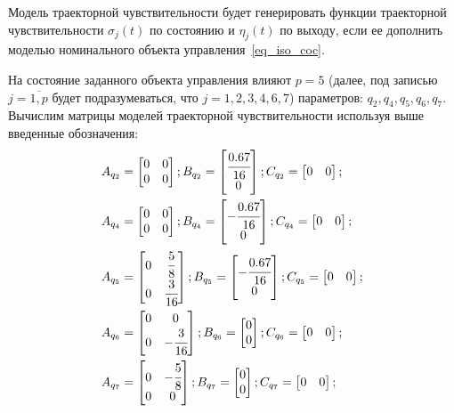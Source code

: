 Модель траекторной чувствительности будет генерировать функции траекторной чувствительности $\sigma_j (t)$ по состоянию и $\eta_j (t)$ по выходу, если ее дополнить моделью номинального объекта управления~\ref{eq_iso_coc}.

На состояние заданного объекта управления влияют $p = 5$ (далее, под записью $j = \overline{1, p}$ будет подразумеваться, что $j = 1,2,3,4,6,7$) параметров: $q_2, q_4, q_5, q_6, q_7$. Вычислим матрицы моделей траекторной чувствительности используя выше введенные обозначения:
\begin{align}
	&A_{q_2} = 
	\begin{bmatrix}
		0 & 0\\
		0 & 0
	\end{bmatrix};
	B_{q_2} = 
	\begin{bmatrix}
		\cfrac{0.67}{16}\\
		0
	\end{bmatrix};
	C_{q_2} = 
	\begin{bmatrix}
		0 & 0
	\end{bmatrix};\\
	&A_{q_4} = 
	\begin{bmatrix}
	0 & 0\\
	0 & 0
	\end{bmatrix};
	B_{q_4} = 
	\begin{bmatrix}
	-\cfrac{0.67}{16}\\
	0
	\end{bmatrix};
	C_{q_4} = 
	\begin{bmatrix}
	0 & 0
	\end{bmatrix};\\
	&A_{q_5} = 
	\begin{bmatrix}
	0 & \cfrac{5}{8}\\
	0 & \cfrac{3}{16}
	\end{bmatrix};
	B_{q_5} = 
	\begin{bmatrix}
	-\cfrac{0.67}{16}\\
	0
	\end{bmatrix};
	C_{q_5} = 
	\begin{bmatrix}
	0 & 0
	\end{bmatrix};\\
	&A_{q_6} = 
	\begin{bmatrix}
	0 & 0\\
	0 & - \cfrac{3}{16}
	\end{bmatrix};
	B_{q_6} = 
	\begin{bmatrix}
	0\\
	0
	\end{bmatrix};
	C_{q_6} = 
	\begin{bmatrix}
	0 & 0
	\end{bmatrix};\\
	&A_{q_7} = 
	\begin{bmatrix}
	0 & -\cfrac{5}{8}\\
	0 & 0
	\end{bmatrix};
	B_{q_7} = 
	\begin{bmatrix}
	0\\
	0
	\end{bmatrix};
	C_{q_7} = 
	\begin{bmatrix}
	0 & 0
	\end{bmatrix};
\end{align}

